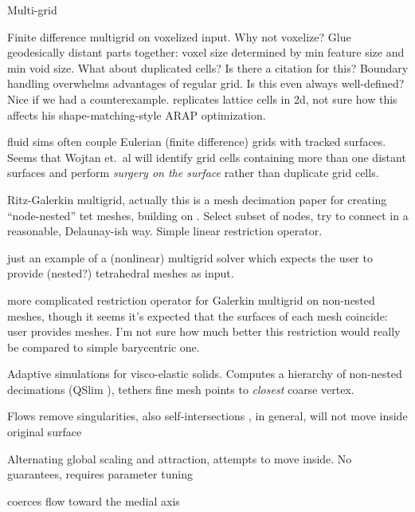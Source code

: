 Multi-grid 

\cite{McAdams:2011} Finite difference multigrid on voxelized input. Why not
voxelize? Glue geodesically distant parts together: voxel size determined by
min feature size and min void size. What about duplicated cells? Is there a
citation for this? Boundary handling overwhelms advantages of regular grid. Is
this even always well-defined? Nice if we had a counterexample.
\cite{Sykora09} replicates lattice cells in 2d, not sure how this affects his
shape-matching-style ARAP optimization.

\cite{wojtan2011liquid} fluid sims often couple Eulerian (finite difference)
grids with tracked surfaces. Seems that Wojtan et.\ al will identify grid cells
containing more than one distant surfaces and perform \emph{surgery on the
surface} rather than duplicate grid cells.

\cite{Adams:1999:PMS} Ritz-Galerkin multigrid, actually this is a mesh
decimation paper for creating ``node-nested'' tet meshes, building on
\cite{guillard1993}. Select subset of nodes, try to connect in a reasonable,
Delaunay-ish way. Simple linear restriction operator.

\cite{fish1995efficient} just an example of a (nonlinear) multigrid solver
which expects the user to provide (nested?) tetrahedral meshes as input.

\cite{feng1997non} more complicated restriction operator for Galerkin multigrid
on non-nested meshes, though it seems it's expected that the surfaces of each
mesh coincide: user provides meshes. I'm not sure how much better this
restriction would really be compared to simple barycentric one.

\cite{Debunne:2001:DRD} 
Adaptive simulations for visco-elastic solids. Computes a hierarchy of
non-nested decimations (QSlim \cite{Garland:1997:SSU}), tethers fine mesh
points to \emph{closest} coarse vertex.

Flows
\cite{Kazhdan2012} remove singularities, also self-intersections
\cite{Sacht:SIV:2013}, in general, will not move inside original surface

Alternating global scaling and attraction, attempts to move inside. No
guarantees, requires parameter tuning \cite{Wang:2008}

\cite{Tagliasacchi:2012:MCS} coerces flow toward the medial axis

